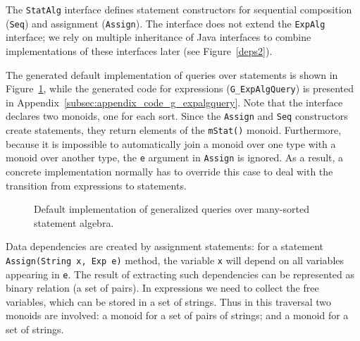 

The \lstinline{StatAlg} interface defines  statement constructors for sequential composition
(\lstinline{Seq}) and assignment (\lstinline{Assign}). The interface does not extend the \lstinline{ExpAlg} interface; we rely on multiple inheritance of Java interfaces to combine implementations of these interfaces later (see Figure~\ref{deps2}).

The generated
default implementation of queries over statements is shown in
Figure~\ref{LST:gstatquery}, while the generated code for expressions (\lstinline{G_ExpAlgQuery}) is
presented in Appendix~\ref{subsec:appendix_code_g_expalgquery}.  Note that the interface declares two
monoids, one for each sort.  Since the \lstinline{Assign} and
\lstinline{Seq} constructors create statements, they return elements
of the \lstinline{mStat()} monoid.  Furthermore, because it is
impossible to automatically join a monoid over one type with a monoid
over another type, the \lstinline{e} argument in \lstinline{Assign}
is ignored.  As a result, a
concrete implementation normally has to override this case to deal with the
transition from expressions to statements.

\begin{figure}[t]
\nocaptionrule
\caption{Default implementation of generalized queries over many-sorted statement algebra.}
\label{LST:gstatquery}
\end{figure}



Data dependencies are created by assignment statements: for a
statement \lstinline{Assign(String x, Exp e)} method, the variable
\lstinline{x} will depend on all variables appearing in \lstinline{e}.
The result of extracting such dependencies can be represented as
binary relation (a set of pairs). In expressions we need to collect
the free variables, which can be stored in a set of strings.  Thus in
this traversal two monoids are involved: a monoid for a set of pairs
of strings; and a monoid for a set of strings.

